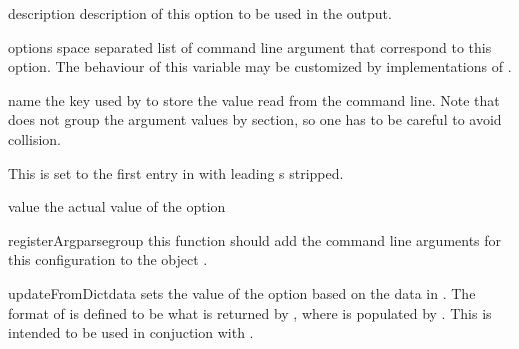 \begin{memberdesc}[ConfigOption]{description}
  description of this option to be used in the  output.
\end{memberdesc}

\begin{memberdesc}[ConfigOption]{options}
  space separated list of command line argument that correspond to this option.
  The behaviour of this variable may be customized by implementations of
  .
\end{memberdesc}

\begin{memberdesc}[ConfigOption]{name}
  the key used by  to store the value read from the command line.
  Note that  does not group the argument values by section, so
  one has to be careful to avoid collision.

  This is set to the first entry in  with leading \code{-}s
  stripped.
\end{memberdesc}

\begin{memberdesc}[ConfigOption]{value}
  the actual value of the option
\end{memberdesc}

\begin{methoddesc}[ConfigOption]{registerArgparse}{group}
  this function should add the command line arguments for this configuration to
  the  object .
\end{methoddesc}

\begin{methoddesc}[ConfigOption]{updateFromDict}{data}
  sets the value of the option based on the data in . The format of
   is defined to be what is returned by
  , where  is populated by
  . This is intended to be used in conjuction with
  .
\end{methoddesc}

